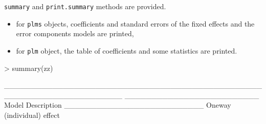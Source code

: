 \documentclass{article}
\begin{document}
\texttt{summary} and \texttt{print.summary} methods are provided. 

\begin{itemize}
\item for  \texttt{plms} objects, coefficients and standard errors
  of the fixed effects and the error components models are printed,
\item for  \texttt{plm} object, the table of coefficients and some
  statistics are printed.
\end{itemize}


\begin{Schunk}
\begin{Sinput}
> summary(zz)
\end{Sinput}
\begin{Soutput}
______________________________________________________________________ 
_________________________ Model Description __________________________
Oneway (individual) effect


\end{Soutput}
\end{Schunk}
\end{document}
